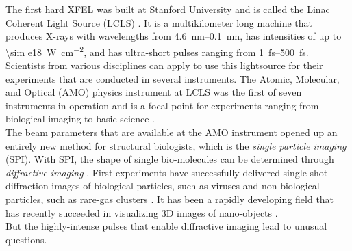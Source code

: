 %
The first hard XFEL was built at Stanford University and is called the Linac Coherent Light Source (LCLS) \citep{Emma-2010-NatPho}. It is a multikilometer long machine that produces X-rays with wavelengths from \SIrange{4.6}{0.1}{\nano\meter}, has intensities of up to \SI{\sim e18}{\watt\per\square\centi\meter}, and has ultra-short pulses ranging from \SIrange{1}{500}{\femto\second}. Scientists from various disciplines can apply to use this lightsource for their experiments that are conducted in several instruments. The Atomic, Molecular, and Optical (AMO) physics instrument at LCLS was the first of seven instruments in operation and is a focal point for experiments ranging from biological imaging to basic science \citep{Bostedt-2016-RMP}.\\[1\baselineskip]
%
The beam parameters that are available at the AMO instrument opened up an entirely new method for structural biologists, which is the \textit{single particle imaging} (SPI). With SPI, the shape of single bio-molecules can be determined through \textit{diffractive imaging} \citep{Chapman-2006-NatPhys}. First experiments have successfully delivered single-shot diffraction images of biological particles, such as viruses \citep{Seibert-2011-Nature} and non-biological particles, such as rare-gas clusters \citep{Gomez-2014-Science}. It has been a rapidly developing field that has recently succeeded in visualizing 3D images of nano-objects \citep{Ekeberg-2015-PRL,Barke-2015-NatComm}.\\[1\baselineskip]
%
But the highly-intense pulses that enable diffractive imaging lead to unusual questions. 
%
